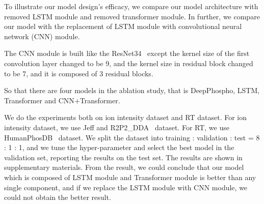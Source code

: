 To illustrate our model design's efficacy, we compare our model architecture with removed LSTM module and removed transformer module. In further, we compare our model with the replacement of LSTM module with convolutional neural network (CNN) module.

The CNN module is built like the ResNet34~\cite{he2015deep} except the kernel size of the first convolution layer changed to be 9, and the kernel size in residual block changed to be 7, and it is composed of 3 residual blocks.

So that there are four models in the ablation study, that is DeepPhospho, LSTM, Transformer and CNN$+$Transformer. 

We do the experiments both on ion intensity dataset and RT dataset. For ion intensity dataset, we use Jeff and R2P2\_DDA~\cite{leutert2019r2} dataset. For RT, we use HumanPhosDB~\cite{lawrence2016plug} dataset. We split the dataset into training : validation : test = 8 : 1 : 1, and we tune the hyper-parameter and select the best model in the validation set, reporting the results on the test set.
The results are shown in supplementary materials. From the result, we could conclude that our model which is composed of LSTM module and Transformer module is better than any single component, and if we replace the LSTM module with CNN module, we could not obtain the better result.

